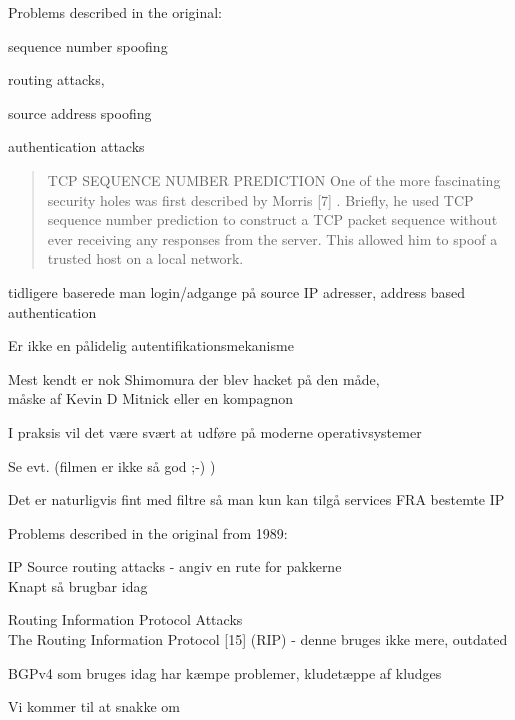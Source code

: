 \documentclass[Screen16to9,17pt]{foils}
\begin{document}
\begin{list1}
\item Problems described in the original:
\begin{list2}
\item sequence number spoofing
\item routing attacks,
\item source address spoofing
\item authentication attacks
\end{list2}
\end{list1}


\vskip 5mm
\begin{quote}
TCP SEQUENCE NUMBER PREDICTION
One of the more fascinating security holes was first described by Morris [7] . Briefly, he used TCP
sequence number prediction to construct a TCP packet sequence without ever receiving any responses
from the server. This allowed him to spoof a trusted host on a local network.
\end{quote}

\begin{list1}
\item tidligere baserede man login/adgange på source IP adresser, address based authentication
\item Er ikke en pålidelig autentifikationsmekanisme
\item Mest kendt er nok Shimomura der blev hacket på den måde, \\
måske af Kevin D Mitnick eller en kompagnon
\item I praksis vil det være svært at udføre på moderne operativsystemer
\item Se evt.  (filmen er ikke så god ;-) )
\item Det er naturligvis fint med filtre så man kun kan tilgå services FRA bestemte IP
\end{list1}


\begin{list1}
\item Problems described in the original from 1989:
\begin{list2}
\item IP Source routing attacks - angiv en rute for pakkerne\\
Knapt så brugbar idag
\item Routing Information Protocol Attacks\\
The Routing Information Protocol [15] (RIP) - denne bruges ikke mere, outdated
\item BGPv4 som bruges idag har kæmpe problemer, kludetæppe af kludges
\end{list2}
\item Vi kommer til at snakke om 
\end{list1}
\end{document}
